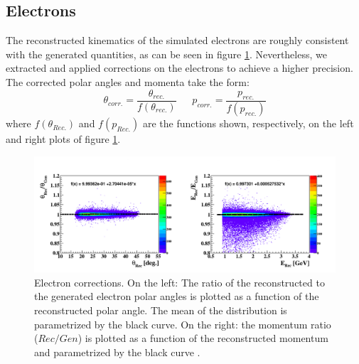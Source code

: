 \subsection{Electrons}
The reconstructed kinematics of the simulated electrons are roughly consistent with the generated quantities, as can be seen in figure \ref{fig:electron_corrections}. Nevertheless, we extracted and applied corrections on the electrons to achieve a higher precision. The corrected polar angles and momenta take the form:
\begin{equation}
\theta_{corr.} = \frac{\theta_{rec.}}{f(\theta_{rec.})} ~~~~~~~ p_{corr.} = \frac{p_{rec.}}{f(p_{rec.})}
\label{equation:correcting_function}
\end{equation}  
where $f(\theta_{Rec.})$ and $f(p_{Rec.})$ are the functions shown, respectively, on the left and right plots of figure \ref{fig:electron_corrections}.
\begin{figure}[tbp]
\centering
\includegraphics[scale=0.41]{fig_simulation/before_electron_Rec_gen.png}
\caption{Electron corrections. On the left: The ratio of the reconstructed to the generated electron polar angles is plotted as a function of the reconstructed polar angle. The mean of the distribution is parametrized by the black curve. On the right: the momentum ratio ($Rec/Gen$) is plotted as a function of the reconstructed momentum and parametrized by the black curve .} 
\label{fig:electron_corrections}
\end{figure}

